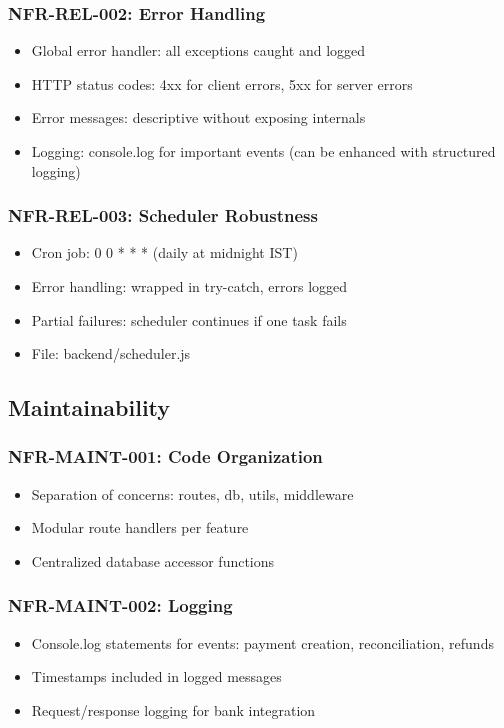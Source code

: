\documentclass[12pt,a4paper]{article}
\begin{document}
\subsubsection{NFR-REL-002: Error Handling}
\begin{itemize}
  \item Global error handler: all exceptions caught and logged
  \item HTTP status codes: 4xx for client errors, 5xx for server errors
  \item Error messages: descriptive without exposing internals
  \item Logging: console.log for important events (can be enhanced with structured logging)
\end{itemize}

\subsubsection{NFR-REL-003: Scheduler Robustness}
\begin{itemize}
  \item Cron job: 0 0 * * * (daily at midnight IST)
  \item Error handling: wrapped in try-catch, errors logged
  \item Partial failures: scheduler continues if one task fails
  \item File: backend/scheduler.js
\end{itemize}

\subsection{Maintainability}

\subsubsection{NFR-MAINT-001: Code Organization}
\begin{itemize}
  \item Separation of concerns: routes, db, utils, middleware
  \item Modular route handlers per feature
  \item Centralized database accessor functions
\end{itemize}

\subsubsection{NFR-MAINT-002: Logging}
\begin{itemize}
  \item Console.log statements for events: payment creation, reconciliation, refunds
  \item Timestamps included in logged messages
  \item Request/response logging for bank integration
\end{itemize}
\end{document}
